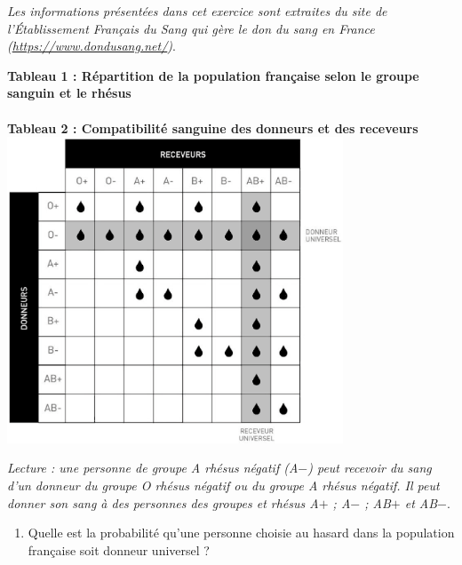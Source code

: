 \bigskip


\begin{exercice}[CRPE 2018 G2]
   {\it Les informations présentées dans cet exercice sont extraites du site de l’Établissement Français du Sang qui gère le don du sang en France (\href{https://www.dondusang.net/}{https://www.dondusang.net/})}.
   \begin{center}
      {\bf Tableau 1 : Répartition de la population française selon le groupe sanguin et le rhésus} \\ [1mm] 
       \\ [3mm]
      {\bf Tableau 2 : Compatibilité sanguine des donneurs et des receveurs} \\ [1mm]
      \includegraphics[width=10cm]{Organisation_gestion_donnees/Images/D7_ex_donneurs_receveurs}
   \end{center}
   \vspace*{-3mm}
   {\it Lecture : une personne de groupe A rhésus négatif (A$-$) peut recevoir du sang d’un donneur du groupe O rhésus négatif ou du groupe A rhésus négatif. Il peut donner son sang à des personnes des groupes et rhésus A$+$ ; A$-$ ; AB$+$ et AB$-$}. \\ [-3mm]
   \begin{enumerate}
      \item Quelle est la probabilité qu’une personne choisie au hasard dans la population française soit donneur universel ?

\end{enumerate}
\end{exercice}
